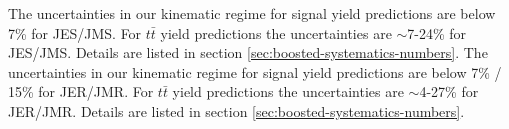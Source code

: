 The uncertainties in our kinematic regime for signal yield predictions are below 7\% for JES/JMS. For $t\bar{t}$ yield predictions the uncertainties are $\sim$7-24\% for JES/JMS. Details are listed in section \ref{sec:boosted-systematics-numbers}. The uncertainties in our kinematic regime for signal yield predictions are below 7\% / 15\% for JER/JMR. For $t\bar{t}$ yield predictions the uncertainties are $\sim$4-27\% for JER/JMR. Details are listed in section \ref{sec:boosted-systematics-numbers}.



